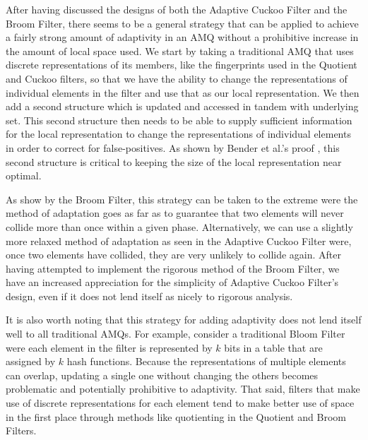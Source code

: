 \documentclass[../paper.tex]{subfiles}
\begin{document}
After having discussed the designs of both the Adaptive Cuckoo Filter and the 
Broom Filter, there seems to be a general strategy that can be applied to 
achieve a fairly strong amount of adaptivity in an AMQ without a prohibitive 
increase in the amount of local space used.  We start by taking a traditional 
AMQ that uses discrete representations of its members, like the fingerprints 
used in the Quotient and Cuckoo filters, so that we have the ability to 
change the representations of individual elements in the filter and use that as 
our local representation.  We then add a second structure which is updated and 
accessed in tandem with underlying set.  This second structure then needs to be 
able to supply sufficient information for the local representation to change the 
representations of individual elements in order to correct for false-positives.  As 
shown by Bender et al.'s proof \cite{broom-filter}, this second structure is 
critical to keeping the size of the local representation near optimal.  

	As show by the Broom Filter, this strategy can be taken to the extreme were the 
	method of adaptation goes as far as to guarantee that two elements will never 
	collide more than once within a given phase.  Alternatively, we can use a slightly 
	more relaxed method of adaptation as seen in the Adaptive Cuckoo Filter were, 
	once two elements have collided, they are very unlikely to collide again.  After 
	having attempted to implement the rigorous method of the Broom Filter, we have
	an increased appreciation for the simplicity of Adaptive Cuckoo Filter's design, 
	even if it does not lend itself as nicely to rigorous analysis.  
	
	It is also worth noting that this strategy for adding adaptivity does not lend itself 
	well to all traditional AMQs.  For example, consider a traditional Bloom Filter were 
	each element in the filter is represented by $k$ bits in a table that are assigned by 
	$k$ hash functions.  Because the representations of multiple elements can overlap, 
	updating a single one without changing the others becomes problematic and 
	potentially prohibitive to adaptivity.  That said, filters that make use of discrete 
	representations for each element tend to make better use of space in the first 
	place through methods like quotienting in the Quotient and Broom Filters.  
\end{document}

